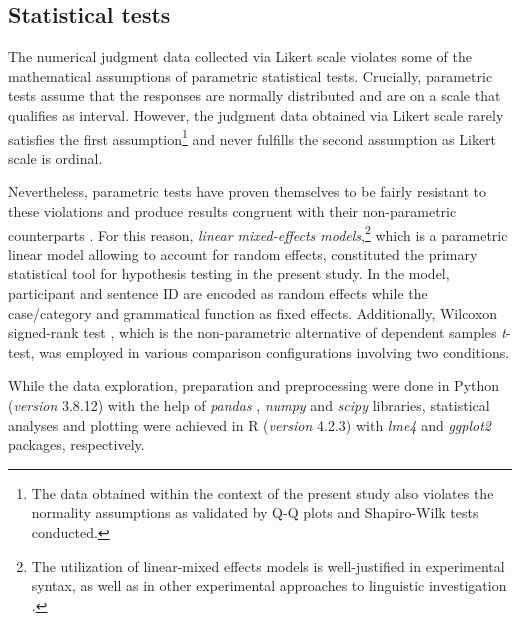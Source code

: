 \subsection{Statistical tests}

The numerical judgment data collected via Likert scale violates some of the mathematical assumptions of parametric statistical tests. Crucially, parametric tests assume that the responses are normally distributed and are on a scale that qualifies as interval. However, the judgment data obtained via Likert scale rarely satisfies the first assumption\footnote{The data obtained within the context of the present study also violates the normality assumptions as validated by Q-Q plots and Shapiro-Wilk tests conducted.} and never fulfills the second assumption as Likert scale is ordinal.
 
\begin{sloppypar}
Nevertheless, parametric tests have proven themselves to be fairly resistant to these violations \citep{Norman2010} and produce results congruent with their \mbox{non-parametric} counterparts \citep{sprouse_schutze_judgmentdata}. For this reason, \textit{linear mixed-effects models},\footnote{The utilization of linear-mixed effects models is well-justified in experimental syntax, as well as in other experimental approaches to linguistic investigation \citep{gibsonetal_2011, cunnings_2012}.} which is a parametric linear model allowing to account for random effects, constituted the primary statistical tool for hypothesis testing in the present study. In the model, participant and sentence ID are encoded as random effects while the case/category and grammatical function as fixed effects. Additionally, Wilcoxon signed-rank test \citep{wilcoxon}, which is the non-parametric alternative of dependent samples \textit{t}-test, was employed in various comparison configurations involving two conditions.
\end{sloppypar}

\begin{sloppypar}
While the data exploration, preparation and preprocessing were done in Python (\textit{version} 3.8.12) with the help of \textit{pandas} \citep{mckinney-pandas}, \textit{numpy} \citep{harris2020array} and \textit{scipy} \citep{scipy} libraries, statistical analyses and plotting were achieved in R (\textit{version} 4.2.3) with \textit{lme4} \citep{lme4} and \textit{ggplot2} \citep{ggplot2} packages, respectively.
\end{sloppypar}




